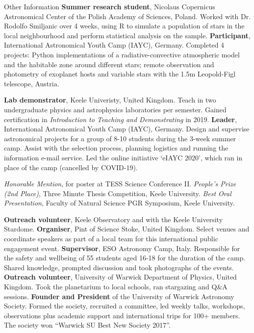 \begin{rubric}{Other Information}
\entry*[2017]%
    \textbf{Summer research student}, Nicolaus Copernicus Astronomical Center of the Polish Academy of Sciences, Poland. Worked with Dr. Rodolfo Smiljanic over 4 weeks, using R to simulate a population of stars in the local neighbourhood and perform statistical analysis on the sample.
\entry*[2014 -- 2017]%
    \textbf{Participant}, International Astronomical Youth Camp (IAYC), Germany. Completed 4 projects: Python implementations of a radiative-convective atmospheric model and the habitable zone around different stars; remote observation and photometry of exoplanet hosts and variable stars with the 1.5m Leopold-Figl telescope, Austria.
    

%
    \textbf{Lab demonstrator}, Keele Univeristy, United Kingdom. Teach in two undergraduate physics and astrophysics laboratories per semester. Gained certification in \emph{Introduction to Teaching and Demonstrating} in 2019.
%
    \textbf{Leader}, International Astronomical Youth Camp (IAYC), Germany. Design and supervise astronomical projects for a group of 8-10 students during the 3-week summer camp. Assist with the selection process, planning logistics and running the information e-mail service. Led the online initiative `eIAYC 2020', which ran in place of the camp (cancelled by COVID-19).

\entry*[2021]
    \textit{Honorable Mention}, for poster at TESS Science Conference II.
\entry*[2021]
    \textit{People's Prize (2nd Place)}, Three Minute Thesis Competition, Keele University.
\entry*[2021]
    \textit{Best Oral Presentation}, Faculty of Natural Science PGR Symposium, Keele University. 

%
    \textbf{Outreach volunteer}, Keele Observatory and with the Keele University Stardome. 
\entry*[2019 -- 2020]%
    \textbf{Organiser}, Pint of Science Stoke, United Kingdom. Select venues and coordinate speakers as part of a local team for this international public engagement event.
\entry*[2017 -- 2019]%
    \textbf{Supervisor}, ESO Astronomy Camp, Italy. Responsible for the safety and wellbeing of 55 students aged 16-18 for the duration of the camp. Shared knowledge, prompted discussion and took photographs of the events.
\entry*[2017 -- 2018]%
    \textbf{Outreach volunteer}, University of Warwick Department of Physics, United Kingdom. Took the planetarium to local schools, ran stargazing and Q\&A sessions.
\entry*[2016 -- 2018]%
    \textbf{Founder and President} of the University of Warwick Astronomy Society. Formed the society, recruited a committee, led weekly talks, workshops, observations plus academic support and international trips for 100+ members. The society won “Warwick SU Best New Society 2017”.
\end{rubric}